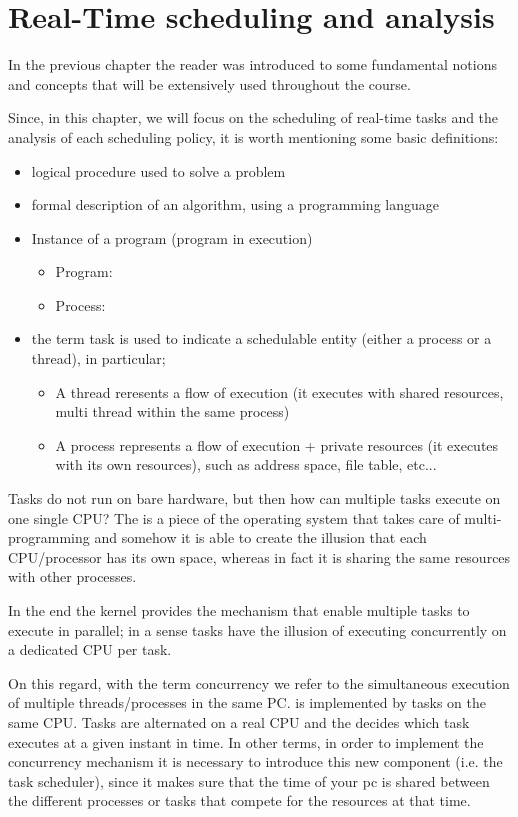 \chapter{Real-Time scheduling and analysis}
In the previous chapter the reader was introduced to some fundamental notions and concepts that will be extensively used throughout the course.

Since, in this chapter, we will focus on the scheduling of real-time tasks and the analysis of each scheduling policy, it is worth mentioning some basic definitions:
\begin{itemize}
\item{logical procedure used to solve a problem}
\item{formal description of an algorithm, using a programming language}
\item{Instance of a program (program in execution)}
\begin{itemize}
\item Program: 
\item Process: 
\end{itemize}
\item the term task is used to indicate a schedulable entity (either a process or a thread), in particular;
\begin{itemize}
\item A thread reresents a flow of execution (it executes with shared resources, multi thread within the same process)
\item A process represents a flow of execution + private resources (it executes with its own resources), such as address space, file table, etc...
\end{itemize}
\end{itemize}

Tasks do not run on bare hardware, but then how can multiple tasks execute on one single CPU?
The  is a piece of the operating system that takes care of multi-programming and somehow it is able to create the illusion that each CPU/processor has its own space, whereas in fact it is sharing the same resources with other processes.

In the end the kernel provides the mechanism that enable multiple tasks to execute in parallel; in a sense tasks have the illusion of executing concurrently on a dedicated CPU per task.

On this regard, with the term concurrency we refer to the simultaneous execution of multiple threads/processes in the same PC. 
 is implemented by  tasks on the same CPU. Tasks are alternated on a real CPU and the  decides which task executes at a given instant in time. In other terms, in order to implement the concurrency mechanism it is necessary to introduce this new component (i.e. the task scheduler), since it makes sure that the time of your pc is shared between the different processes or tasks that compete for the resources at that time.

